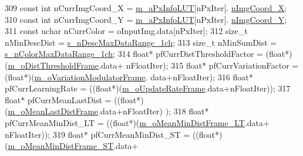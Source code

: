 \begin{DoxyCode}
309             \textcolor{keyword}{const} \textcolor{keywordtype}{int} nCurrImgCoord\_X = \mbox{\hyperlink{class_background_subtractor_l_b_s_p_a74e73d4832ccdef652d93756582024db}{m\_aPxInfoLUT}}[nPxIter].
      \mbox{\hyperlink{struct_background_subtractor_l_b_s_p_1_1_px_info_base_a10966fe72f000045adede9e853156b48}{nImgCoord\_X}};
310             \textcolor{keyword}{const} \textcolor{keywordtype}{int} nCurrImgCoord\_Y = \mbox{\hyperlink{class_background_subtractor_l_b_s_p_a74e73d4832ccdef652d93756582024db}{m\_aPxInfoLUT}}[nPxIter].
      \mbox{\hyperlink{struct_background_subtractor_l_b_s_p_1_1_px_info_base_a42cb6eecda647b2a11b90ea420f2bc31}{nImgCoord\_Y}};
311             \textcolor{keyword}{const} uchar nCurrColor = oInputImg.data[nPxIter];
312             \textcolor{keywordtype}{size\_t} nMinDescDist = \mbox{\hyperlink{_background_subtractor_su_b_s_e_n_s_e_8cpp_a15305d6ff106cc0ab9f1b7cfb21a27c7}{s\_nDescMaxDataRange\_1ch}};
313             \textcolor{keywordtype}{size\_t} nMinSumDist = \mbox{\hyperlink{_background_subtractor_su_b_s_e_n_s_e_8cpp_ad0ce3de05453a1b3738f711d9955031f}{s\_nColorMaxDataRange\_1ch}};
314             \textcolor{keywordtype}{float}* pfCurrDistThresholdFactor = (\textcolor{keywordtype}{float}*)(\mbox{\hyperlink{class_background_subtractor_su_b_s_e_n_s_e_a491a1e2b81dee87a721a421719bf2836}{m\_oDistThresholdFrame}}.data+
      nFloatIter);
315             \textcolor{keywordtype}{float}* pfCurrVariationFactor = (\textcolor{keywordtype}{float}*)(\mbox{\hyperlink{class_background_subtractor_su_b_s_e_n_s_e_a47d9cf067ac639d95fcb810c894bb770}{m\_oVariationModulatorFrame}}.
      data+nFloatIter);
316             \textcolor{keywordtype}{float}* pfCurrLearningRate = ((\textcolor{keywordtype}{float}*)(\mbox{\hyperlink{class_background_subtractor_su_b_s_e_n_s_e_a90cb2cc5cbe3f2f0b01e06f514c8b569}{m\_oUpdateRateFrame}}.data+nFloatIter));
317             \textcolor{keywordtype}{float}* pfCurrMeanLastDist = ((\textcolor{keywordtype}{float}*)(\mbox{\hyperlink{class_background_subtractor_su_b_s_e_n_s_e_ad95bb91ff7ef9db725772b37d679e1a2}{m\_oMeanLastDistFrame}}.data+nFloatIter)
      );
318             \textcolor{keywordtype}{float}* pfCurrMeanMinDist\_LT = ((\textcolor{keywordtype}{float}*)(\mbox{\hyperlink{class_background_subtractor_su_b_s_e_n_s_e_a8318e35d5fbbcffb8729700ef5e71a6e}{m\_oMeanMinDistFrame\_LT}}.data+
      nFloatIter));
319             \textcolor{keywordtype}{float}* pfCurrMeanMinDist\_ST = ((\textcolor{keywordtype}{float}*)(\mbox{\hyperlink{class_background_subtractor_su_b_s_e_n_s_e_a53584c5c79017947c59d05dfd247cf5e}{m\_oMeanMinDistFrame\_ST}}.data+

\end{DoxyCode}
